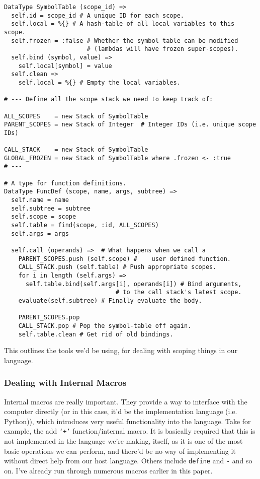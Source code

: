 \documentclass{article}
\newcommand{\code}[1]{\texttt{#1}}
\begin{document}
\begin{verbatim}
DataType SymbolTable (scope_id) =>
  self.id = scope_id # A unique ID for each scope.
  self.local = %{} # A hash-table of all local variables to this scope.
  self.frozen = :false # Whether the symbol table can be modified
                       # (lambdas will have frozen super-scopes).
  self.bind (symbol, value) =>
    self.local[symbol] = value
  self.clean =>
    self.local = %{} # Empty the local variables.

# --- Define all the scope stack we need to keep track of:

ALL_SCOPES    = new Stack of SymbolTable
PARENT_SCOPES = new Stack of Integer  # Integer IDs (i.e. unique scope IDs)

CALL_STACK    = new Stack of SymbolTable
GLOBAL_FROZEN = new Stack of SymbolTable where .frozen <- :true
# ---

# A type for function definitions.
DataType FuncDef (scope, name, args, subtree) =>
  self.name = name
  self.subtree = subtree
  self.scope = scope
  self.table = find(scope, :id, ALL_SCOPES)
  self.args = args

  self.call (operands) =>  # What happens when we call a
    PARENT_SCOPES.push (self.scope) #    user defined function.
    CALL_STACK.push (self.table) # Push appropriate scopes.
    for i in length (self.args) =>
      self.table.bind(self.args[i], operands[i]) # Bind arguments,
                               # to the call stack's latest scope.
    evaluate(self.subtree) # Finally evaluate the body.

    PARENT_SCOPES.pop
    CALL_STACK.pop # Pop the symbol-table off again.
    self.table.clean # Get rid of old bindings.
\end{verbatim}
      This outlines the tools we'd be using, for dealing with scoping things in
      our language.
      \clearpage

    \subsubsection{Dealing with Internal Macros}
      Internal macros are really important. They provide a way to interface with
      the computer directly (or in this case, it'd be the implementation
      language (i.e. Python)), which introduces very useful functionality into
      the language. Take for example, the add \code{`+'} function/internal macro.
      It is basically required that this is not implemented in the language we're
      making, itself, as it is one of the most basic operations we can perform,
      and there'd be no way of implementing it without direct help from our
      host language. Others include \code{define} and \code{-} and so on.
      I've already run through numerous macros earlier in this paper.
\end{document}
